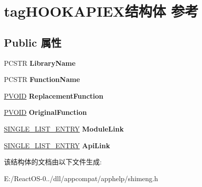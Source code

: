 \hypertarget{structtag_h_o_o_k_a_p_i_e_x}{}\section{tag\+H\+O\+O\+K\+A\+P\+I\+E\+X结构体 参考}
\label{structtag_h_o_o_k_a_p_i_e_x}
\subsection*{Public 属性}
\begin{DoxyCompactItemize}
\item 
\mbox{\label{structtag_h_o_o_k_a_p_i_e_x_a59319a733b9cc6e2494af6951ad3b252}} 
P\+C\+S\+TR {\bfseries Library\+Name}
\item 
\mbox{\label{structtag_h_o_o_k_a_p_i_e_x_af40c63c53f80fa1aaf138f7ff804f928}} 
P\+C\+S\+TR {\bfseries Function\+Name}
\item 
\mbox{\label{structtag_h_o_o_k_a_p_i_e_x_a68735a84c2e81c8e81bd1483d0b87855}} 
\hyperlink{interfacevoid}{P\+V\+O\+ID} {\bfseries Replacement\+Function}
\item 
\mbox{\label{structtag_h_o_o_k_a_p_i_e_x_aeaf85e7239b26b37593a945c51b3afd2}} 
\hyperlink{interfacevoid}{P\+V\+O\+ID} {\bfseries Original\+Function}
\item 
\mbox{\label{structtag_h_o_o_k_a_p_i_e_x_a1c0361588e66f225ac31e8b60c6db7cc}} 
\hyperlink{struct___s_i_n_g_l_e___l_i_s_t___e_n_t_r_y}{S\+I\+N\+G\+L\+E\+\_\+\+L\+I\+S\+T\+\_\+\+E\+N\+T\+RY} {\bfseries Module\+Link}
\item 
\mbox{\label{structtag_h_o_o_k_a_p_i_e_x_afc2e9fe80261033d3a370f1668a5ffc6}} 
\hyperlink{struct___s_i_n_g_l_e___l_i_s_t___e_n_t_r_y}{S\+I\+N\+G\+L\+E\+\_\+\+L\+I\+S\+T\+\_\+\+E\+N\+T\+RY} {\bfseries Api\+Link}
\end{DoxyCompactItemize}


该结构体的文档由以下文件生成\+:\begin{DoxyCompactItemize}
\item 
E\+:/\+React\+O\+S-\/0../dll/appcompat/apphelp/shimeng.\+h\end{DoxyCompactItemize}
